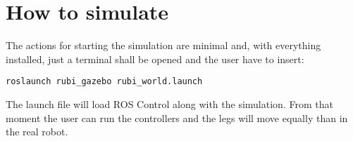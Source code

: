 \section{How to simulate} %
\label{sec:how_to_simulate}
The actions for starting the simulation are minimal and, with everything installed, just a terminal shall be opened and the user have to insert:

\begin{lstlisting}
roslaunch rubi_gazebo rubi_world.launch
\end{lstlisting}

The launch file will load ROS Control along with the simulation.
From that moment the user can run the controllers and the legs will move equally than in the real robot.
